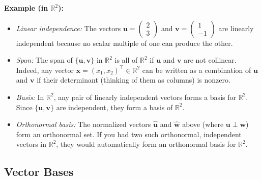 \noindent
\textbf{Example (in $\mathbb{R}^2$):}
\begin{itemize}
\item \emph{Linear independence:} 
      The vectors 
      \(\mathbf{u} = \begin{pmatrix} 2 \\ 3 \end{pmatrix}\) 
      and 
      \(\mathbf{v} = \begin{pmatrix} 1 \\ -1 \end{pmatrix}\) 
      are linearly independent because no scalar multiple of one can produce the other.
\item \emph{Span:}
      The span of \(\{\mathbf{u}, \mathbf{v}\}\) in \(\mathbb{R}^2\) is all of \(\mathbb{R}^2\) 
      if \(\mathbf{u}\) and \(\mathbf{v}\) are not collinear. 
      Indeed, any vector \(\mathbf{x} = (x_1, x_2)^\top \in \mathbb{R}^2\) can be written 
      as a combination of \(\mathbf{u}\) and \(\mathbf{v}\) if their determinant 
      (thinking of them as columns) is nonzero.
\item \emph{Basis:} 
      In \(\mathbb{R}^2\), any pair of linearly independent vectors forms a basis for \(\mathbb{R}^2\). 
      Since \(\{\mathbf{u}, \mathbf{v}\}\) are independent, they form a basis of \(\mathbb{R}^2\).
\item \emph{Orthonormal basis:}
      The normalized vectors 
      \(\widehat{\mathbf{u}}\) and \(\widehat{\mathbf{w}}\) above 
      (where \(\mathbf{u}\perp \mathbf{w}\)) form an orthonormal set. 
      If you had two such orthonormal, independent vectors in \(\mathbb{R}^2\), 
      they would automatically form an orthonormal basis for \(\mathbb{R}^2\).
\end{itemize}



\subsection{Vector Bases}
